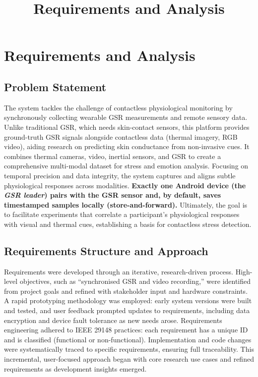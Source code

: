 \documentclass{report}
\title{Requirements and Analysis}
\author{}
\date{}
\begin{document}
    \maketitle

    \chapter{Requirements and Analysis}
    \label{ch:requirements}

    \section{Problem Statement}
    The system tackles the challenge of contactless physiological monitoring by synchronously collecting wearable GSR measurements and remote sensory data. Unlike traditional GSR, which needs skin-contact sensors, this platform provides ground-truth GSR signals alongside contactless data (thermal imagery, RGB video), aiding research on predicting skin conductance from non-invasive cues. It combines thermal cameras, video, inertial sensors, and GSR to create a comprehensive multi-modal dataset for stress and emotion analysis. Focusing on temporal precision and data integrity, the system captures and aligns subtle physiological responses across modalities. \textbf{Exactly one Android device (the \emph{GSR leader}) pairs with the GSR sensor and, by default, saves timestamped samples locally (store-and-forward).} Ultimately, the goal is to facilitate experiments that correlate a participant's physiological responses with visual and thermal cues, establishing a basis for contactless stress detection.

    \section{Requirements Structure and Approach}
    Requirements were developed through an iterative, research-driven process. High-level objectives, such as “synchronised GSR and video recording,” were identified from project goals and refined with stakeholder input and hardware constraints. A rapid prototyping methodology was employed: early system versions were built and tested, and user feedback prompted updates to requirements, including data encryption and device fault tolerance as new needs arose. Requirements engineering adhered to IEEE 29148 practices: each requirement has a unique ID and is classified (functional or non-functional). Implementation and code changes were systematically traced to specific requirements, ensuring full traceability. This incremental, user-focused approach began with core research use cases and refined requirements as development insights emerged.
\end{document}

